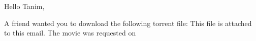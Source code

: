 \documentclass{article}
\begin{document}
Hello Tanim,

A friend wanted you to download the following torrent file: %
This file is attached to this email. The movie was requested on %
\end{document}
